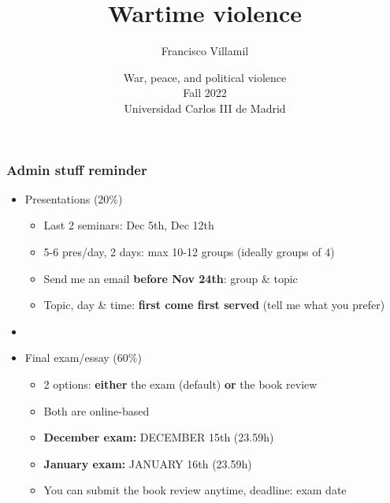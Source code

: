 \documentclass[utf8, xcolor=dvipsnames, handout]{beamer}
\title[Wartime violence]{Wartime violence}
\author[Francisco Villamil]{Francisco Villamil}
\date[UC3M / Fall 2022]{War, peace, and political violence\\Fall 2022\\Universidad Carlos III de Madrid}
\begin{document}
\begin{frame}
  \titlepage
\end{frame}


\begin{frame}
\frametitle{Admin stuff reminder}
\centering

\begin{itemize}[<+->]
  \item Presentations (20\%)
  \begin{itemize}
    \item Last 2 seminars: Dec 5th, Dec 12th
    \item 5-6 pres/day, 2 days: max 10-12 groups (ideally groups of 4)
    \item Send me an email \textbf{before Nov 24th}: group \& topic
    \item Topic, day \& time: \textbf{first come first served} (tell me what you prefer)
  \end{itemize}
  \item[]
  \item Final exam/essay (60\%)
  \begin{itemize}
    \item 2 options: \textbf{either} the exam (default) \textbf{or} the book review
    \item Both are online-based
    \item \textbf{December exam:} DECEMBER 15th (23.59h)
    \item \textbf{January exam:} JANUARY 16th (23.59h)
    \item You can submit the book review anytime, deadline: exam date

  \end{itemize}
\end{itemize}

\end{frame}
\end{document}
